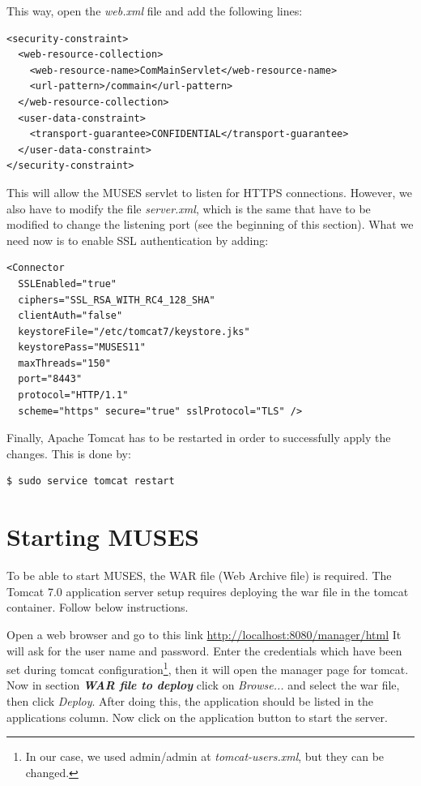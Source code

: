 \documentclass[a4paper,11pt]{book}
\begin{document}
This way, open the \textit{web.xml} file and add the following lines:

\begin{verbatim}
<security-constraint>
  <web-resource-collection>
    <web-resource-name>ComMainServlet</web-resource-name>
    <url-pattern>/commain</url-pattern>
  </web-resource-collection>
  <user-data-constraint>
    <transport-guarantee>CONFIDENTIAL</transport-guarantee>
  </user-data-constraint>
</security-constraint>
\end{verbatim}

This will allow the MUSES servlet to listen for HTTPS connections. However, we also have to modify the file \textit{server.xml}, which is the same that have to be modified to change the listening port (see the beginning of this section). What we need now is to enable SSL authentication by adding:

\begin{verbatim}
<Connector
  SSLEnabled="true"
  ciphers="SSL_RSA_WITH_RC4_128_SHA"
  clientAuth="false"
  keystoreFile="/etc/tomcat7/keystore.jks"
  keystorePass="MUSES11"
  maxThreads="150"
  port="8443"
  protocol="HTTP/1.1"
  scheme="https" secure="true" sslProtocol="TLS" />
\end{verbatim}

Finally, Apache Tomcat has to be restarted in order to successfully apply the changes. This is done by:

\begin{verbatim}
$ sudo service tomcat restart
\end{verbatim}

\section{Starting MUSES}
\label{sec:musestart}

To be able to start MUSES, the WAR file (Web Archive file) is required. %
The Tomcat 7.0 application server setup requires deploying the war file in the tomcat container. Follow below instructions. 

Open a web browser and go to this link
\url{http://localhost:8080/manager/html} 
It will ask for the user name and password. Enter the credentials which have been set during tomcat configuration\footnote{In our case, we used admin/admin at \textit{tomcat-users.xml}, but they can be changed.}, then it will open the manager page for tomcat. Now in section \textit{\textbf{WAR file to deploy}} click on \textit{Browse...} and select the war file, then click \textit{Deploy}. 
After doing this, the application should be listed in the applications column. Now click on the application button to start the server.
\end{document}
